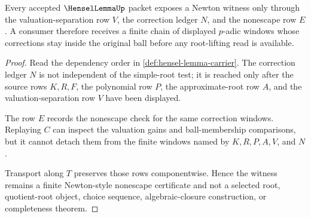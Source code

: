 \begin{theorem}
\label{thm:hensel-lemma-newton-witness-nonescape}
Every accepted $\HenselLemmaUp$ packet exposes a Newton witness only through the valuation-separation row $V$, the correction ledger $N$, and the nonescape row $E$. A consumer therefore receives a finite chain of displayed $p$-adic windows whose corrections stay inside the original ball before any root-lifting read is available.
\end{theorem}
\begin{proof}
Read the dependency order in \autoref{def:hensel-lemma-carrier}. The correction ledger $N$ is not independent of the simple-root test; it is reached only after the source rows $K,R,F$, the polynomial row $P$, the approximate-root row $A$, and the valuation-separation row $V$ have been displayed.

The row $E$ records the nonescape check for the same correction windows. Replaying $C$ can inspect the valuation gains and ball-membership comparisons, but it cannot detach them from the finite windows named by $K,R,P,A,V$, and $N$.

Transport along $T$ preserves those rows componentwise. Hence the witness remains a finite Newton-style nonescape certificate and not a selected root, quotient-root object, choice sequence, algebraic-closure construction, or completeness theorem.
\end{proof}




